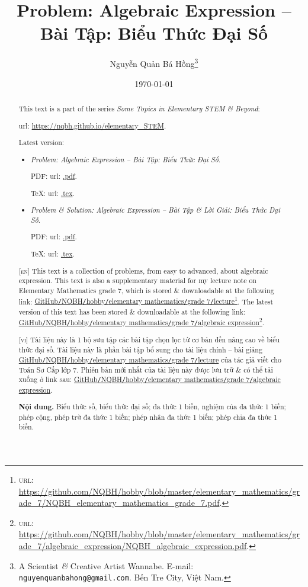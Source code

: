 \documentclass{article}
\title{Problem: Algebraic Expression -- Bài Tập: Biểu Thức Đại Số}
\author{Nguyễn Quản Bá Hồng\footnote{A Scientist {\it\&} Creative Artist Wannabe. E-mail: {\tt nguyenquanbahong@gmail.com}. Bến Tre City, Việt Nam.}}
\date{\today}
\begin{document}
\maketitle
\begin{abstract}
	This text is a part of the series {\it Some Topics in Elementary STEM \& Beyond}:
	
	{\sc url}: \url{https://nqbh.github.io/elementary_STEM}.
	
	Latest version:
	\begin{itemize}
		\item {\it Problem: Algebraic Expression -- Bài Tập: Biểu Thức Đại Số}.
		
		PDF: {\sc url}: \url{.pdf}.
		
		\TeX: {\sc url}: \url{.tex}.
		\item {\it Problem \& Solution: Algebraic Expression -- Bài Tập \& Lời Giải: Biểu Thức Đại Số}.
		
		PDF: {\sc url}: \url{.pdf}.
		
		\TeX: {\sc url}: \url{.tex}.
	\end{itemize}
	\textsc{[en]} This text is a collection of problems, from easy to advanced, about algebraic expression. This text is also a supplementary material for my lecture note on Elementary Mathematics grade 7, which is stored \& downloadable at the following link: \href{https://github.com/NQBH/hobby/blob/master/elementary_mathematics/grade_7/NQBH_elementary_mathematics_grade_7.pdf}{GitHub\texttt{/}NQBH\texttt{/}hobby\texttt{/}elementary mathematics\texttt{/}grade 7\texttt{/}lecture}\footnote{\textsc{url}: \url{https://github.com/NQBH/hobby/blob/master/elementary_mathematics/grade_7/NQBH_elementary_mathematics_grade_7.pdf}.}. The latest version of this text has been stored \& downloadable at the following link: \href{https://github.com/NQBH/hobby/blob/master/elementary_mathematics/grade_7/algebraic_expression/NQBH_algebraic_expression.pdf}{GitHub\texttt{/}NQBH\texttt{/}hobby\texttt{/}elementary mathematics\texttt{/}grade 7\texttt{/}algebraic expression}\footnote{\textsc{url}: \url{https://github.com/NQBH/hobby/blob/master/elementary_mathematics/grade_7/algebraic_expression/NQBH_algebraic_expression.pdf}.}.
	\vspace{2mm}
	
	\textsc{[vi]} Tài liệu này là 1 bộ sưu tập các bài tập chọn lọc từ cơ bản đến nâng cao về biểu thức đại số. Tài liệu này là phần bài tập bổ sung cho tài liệu chính -- bài giảng \href{https://github.com/NQBH/hobby/blob/master/elementary_mathematics/grade_7/NQBH_elementary_mathematics_grade_7.pdf}{GitHub\texttt{/}NQBH\texttt{/}hobby\texttt{/}elementary mathematics\texttt{/}grade 7\texttt{/}lecture} của tác giả viết cho Toán Sơ Cấp lớp 7. Phiên bản mới nhất của tài liệu này được lưu trữ \& có thể tải xuống ở link sau: \href{https://github.com/NQBH/hobby/blob/master/elementary_mathematics/grade_7/algebraic_expression/NQBH_algebraic_expression.pdf}{GitHub\texttt{/}NQBH\texttt{/}hobby\texttt{/}elementary mathematics\texttt{/}grade 7\texttt{/}algebraic expression}.
	
	\textsf{\textbf{Nội dung.} Biểu thức số, biểu thức đại số; đa thức 1 biến, nghiệm của đa thức 1 biến; phép cộng, phép trừ đa thức 1 biến; phép nhân đa thức 1 biến; phép chia đa thức 1 biến.}
\end{abstract}
\end{document}
